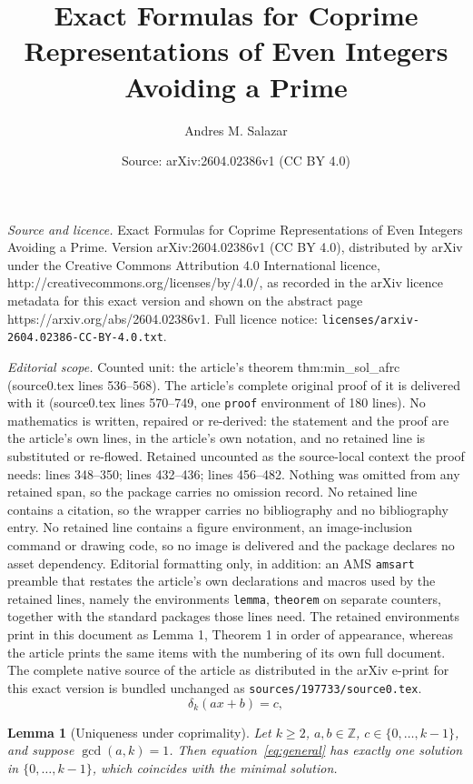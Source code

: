 \documentclass[10pt,a4paper]{amsart}
\title{Exact Formulas for Coprime Representations of Even Integers Avoiding a Prime}
\author{Andres M. Salazar}
\date{Source: arXiv:2604.02386v1 (CC BY 4.0)}
\newtheorem{lemma}{Lemma}
\begin{document}
\maketitle

\noindent\emph{Source and licence.} Exact Formulas for Coprime Representations of Even Integers Avoiding a Prime. Version arXiv:2604.02386v1 (CC BY 4.0), distributed by arXiv under the Creative Commons Attribution 4.0 International licence, http://creativecommons.org/licenses/by/4.0/, as recorded in the arXiv licence metadata for this exact version and shown on the abstract page https://arxiv.org/abs/2604.02386v1. Full licence notice: \texttt{licenses/arxiv-2604.02386-CC-BY-4.0.txt}.\par\smallskip

\noindent\textit{Editorial scope.} Counted unit: the article's theorem thm:min\_sol\_afrc (source0.tex lines 536--568). The article's complete original proof of it is delivered with it (source0.tex lines 570--749, one \texttt{proof} environment of 180 lines). No mathematics is written, repaired or re-derived: the statement and the proof are the article's own lines, in the article's own notation, and no retained line is substituted or re-flowed.  Retained uncounted as the source-local context the proof needs: lines 348--350; lines 432--436; lines 456--482.  Nothing was omitted from any retained span, so the package carries no omission record.  No retained line contains a citation, so the wrapper carries no bibliography and no bibliography entry.  No retained line contains a figure environment, an image-inclusion command or drawing code, so no image is delivered and the package declares no asset dependency.  Editorial formatting only, in addition: an AMS \texttt{amsart} preamble that restates the article's own declarations and macros used by the retained lines, namely the environments \texttt{lemma}, \texttt{theorem} on separate counters, together with the standard packages those lines need.  The retained environments print in this document as Lemma 1, Theorem 1 in order of appearance, whereas the article prints the same items with the numbering of its own full document.  The complete native source of the article as distributed in the arXiv e-print for this exact version is bundled unchanged as \texttt{sources/197733/source0.tex}.
\begin{equation}\label{eq:general}
\delta_k(ax+b) = c,
\end{equation}

\begin{lemma}[Uniqueness under coprimality]\label{lema:unicidad_ep}
Let $k \ge 2$, $a,b \in \mathbb{Z}$, $c \in \{0,\dots,k-1\}$, and suppose
$\gcd(a,k)=1$. Then equation~\eqref{eq:general} has exactly one solution
in $\{0,\dots,k-1\}$, which coincides with the minimal solution.
\end{lemma}
\end{document}
